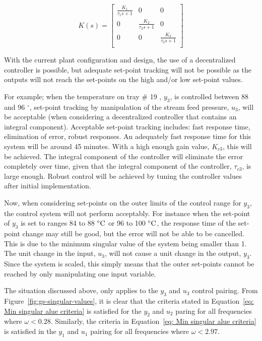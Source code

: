 \begin{equation}
	K(s) = \begin{bmatrix}
	\frac{K_1}{\tau_1s + 1} & 0 & 0\\
	 0 &\frac{K_2}{\tau_2s + 1} & 0\\
	 0 & 0 & \frac{K_3}{\tau_3s + 1}\\
	\end{bmatrix}
\end{equation} 

With the current plant configuration and design, the use of a decentralized controller is possible, but adequate set-point tracking will not be possible as the outputs will not reach the set-points on the high and/or low set-point values.

For example; when the temperature on tray \# 19 , $y_3$, is controlled between 88 and 96 $^{\circ}$, set-point tracking by manipulation of the stream feed pressure, $u_3$, will be acceptable (when considering a decentralized controller that contains an integral component). Acceptable set-point tracking includes: fast response time, elimination of error, robust responses. An adequately fast response time for this system will be around 45 minutes. With a high enough gain value, $K_{c3}$, this will be achieved. The integral component of the controller will eliminate the error completely over time, given that the integral component of the controller, $\tau_{c3}$, is large enough. Robust control will be achieved by tuning the controller values after initial implementation.

Now, when considering set-points on the outer limits of the control range for $y_3$, the control system will not perform acceptably. For instance when the set-point of $y_3$ is set to ranges 84 to 88 $\celsius$ or 96 to 100 $\celsius$, the response time of the set-point change may still be good, but the error will not be able to be cancelled. This is due to the minimum singular value of the system being smaller than 1. The unit change in the input, $u_3$, will not cause a unit change in the output, $y_3$. Since the system is scaled, this simply means that the outer set-points cannot be reached by only manipulating one input variable. 

The situation discussed above, only applies to the $y_3$ and $u_3$ control pairing. From Figure~\ref{fig:gs-singular-values}, it is clear that the criteria stated in Equation~\ref{eq: Min singular alue criteria} is satisfied for the $y_2$ and $u_2$ paring for all frequencies where $\omega<0.28$. Similarly, the criteria in Equation~\ref{eq: Min singular alue criteria} is satisfied in the $y_1$ and $u_1$ pairing for all frequencies where $\omega < 2.97$.


